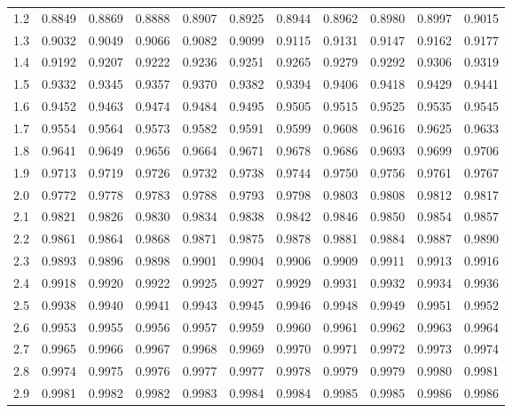 \begin{center}
\begin{tabular}{|l|*{10}{r}|}
1.2 &  0.8849 &  0.8869 &  0.8888 &  0.8907 &  0.8925 &  0.8944 &  0.8962 &  0.8980 &  0.8997 &  0.9015\\ 
1.3 &  0.9032 &  0.9049 &  0.9066 &  0.9082 &  0.9099 &  0.9115 &  0.9131 &  0.9147 &  0.9162 &  0.9177\\ 
1.4 &  0.9192 &  0.9207 &  0.9222 &  0.9236 &  0.9251 &  0.9265 &  0.9279 &  0.9292 &  0.9306 &  0.9319\\ 
1.5 &  0.9332 &  0.9345 &  0.9357 &  0.9370 &  0.9382 &  0.9394 &  0.9406 &  0.9418 &  0.9429 &  0.9441\\ 
1.6 &  0.9452 &  0.9463 &  0.9474 &  0.9484 &  0.9495 &  0.9505 &  0.9515 &  0.9525 &  0.9535 &  0.9545\\ 
1.7 &  0.9554 &  0.9564 &  0.9573 &  0.9582 &  0.9591 &  0.9599 &  0.9608 &  0.9616 &  0.9625 &  0.9633\\ 
1.8 &  0.9641 &  0.9649 &  0.9656 &  0.9664 &  0.9671 &  0.9678 &  0.9686 &  0.9693 &  0.9699 &  0.9706\\ 
1.9 &  0.9713 &  0.9719 &  0.9726 &  0.9732 &  0.9738 &  0.9744 &  0.9750 &  0.9756 &  0.9761 &  0.9767\\ 
2.0 &  0.9772 &  0.9778 &  0.9783 &  0.9788 &  0.9793 &  0.9798 &  0.9803 &  0.9808 &  0.9812 &  0.9817\\ 
2.1 &  0.9821 &  0.9826 &  0.9830 &  0.9834 &  0.9838 &  0.9842 &  0.9846 &  0.9850 &  0.9854 &  0.9857\\ 
2.2 &  0.9861 &  0.9864 &  0.9868 &  0.9871 &  0.9875 &  0.9878 &  0.9881 &  0.9884 &  0.9887 &  0.9890\\ 
2.3 &  0.9893 &  0.9896 &  0.9898 &  0.9901 &  0.9904 &  0.9906 &  0.9909 &  0.9911 &  0.9913 &  0.9916\\ 
2.4 &  0.9918 &  0.9920 &  0.9922 &  0.9925 &  0.9927 &  0.9929 &  0.9931 &  0.9932 &  0.9934 &  0.9936\\ 
2.5 &  0.9938 &  0.9940 &  0.9941 &  0.9943 &  0.9945 &  0.9946 &  0.9948 &  0.9949 &  0.9951 &  0.9952\\ 
2.6 &  0.9953 &  0.9955 &  0.9956 &  0.9957 &  0.9959 &  0.9960 &  0.9961 &  0.9962 &  0.9963 &  0.9964\\ 
2.7 &  0.9965 &  0.9966 &  0.9967 &  0.9968 &  0.9969 &  0.9970 &  0.9971 &  0.9972 &  0.9973 &  0.9974\\ 
2.8 &  0.9974 &  0.9975 &  0.9976 &  0.9977 &  0.9977 &  0.9978 &  0.9979 &  0.9979 &  0.9980 &  0.9981\\ 
2.9 &  0.9981 &  0.9982 &  0.9982 &  0.9983 &  0.9984 &  0.9984 &  0.9985 &  0.9985 &  0.9986 &  0.9986\\ 

\end{tabular}
\end{center}
